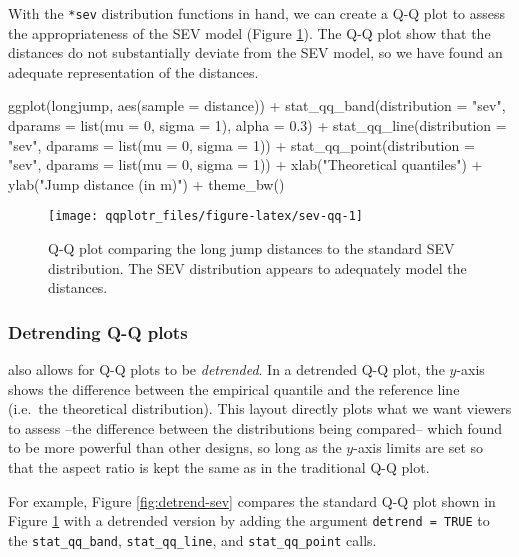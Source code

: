 With the \texttt{*sev} distribution functions in hand, we can create a
Q-Q plot to assess the appropriateness of the SEV model (Figure
\ref{fig:sev-qq}). The Q-Q plot show that the distances do not
substantially deviate from the SEV model, so we have found an adequate
representation of the distances.

\begin{Schunk}
\begin{Sinput}
ggplot(longjump, aes(sample = distance)) +
  stat_qq_band(distribution = "sev", dparams = list(mu = 0, sigma = 1), alpha = 0.3) +
  stat_qq_line(distribution = "sev", dparams = list(mu = 0, sigma = 1)) +
  stat_qq_point(distribution = "sev", dparams = list(mu = 0, sigma = 1)) +
  xlab("Theoretical quantiles") +
  ylab("Jump distance (in m)") +
  theme_bw()
\end{Sinput}
\begin{figure}

{\centering \texttt{[image: qqplotr\_files/figure-latex/sev-qq-1]} 

}

\caption[Q-Q plot comparing the long jump distances to the standard SEV distribution]{Q-Q plot comparing the long jump distances to the standard SEV distribution. The SEV distribution appears to adequately model the distances.}\label{fig:sev-qq}
\end{figure}
\end{Schunk}

\subsubsection{Detrending Q-Q plots}\label{detrending-q-q-plots}

\label{sec:detrending}

 also allows for Q-Q plots to be \emph{detrended}. In a
detrended Q-Q plot, the \(y\)-axis shows the difference between the
empirical quantile and the reference line (i.e.~the theoretical
distribution). This layout directly plots what we want viewers to assess
--the difference between the distributions being compared-- which
\citet{Loy2016-fg} found to be more powerful than other designs, so long
as the \(y\)-axis limits are set so that the aspect ratio is kept the
same as in the traditional Q-Q plot.

For example, Figure \ref{fig:detrend-sev} compares the standard Q-Q plot
shown in Figure \ref{fig:sev-qq} with a detrended version by adding the
argument \texttt{detrend\ =\ TRUE} to the \texttt{stat\_qq\_band},
\texttt{stat\_qq\_line}, and \texttt{stat\_qq\_point} calls.

